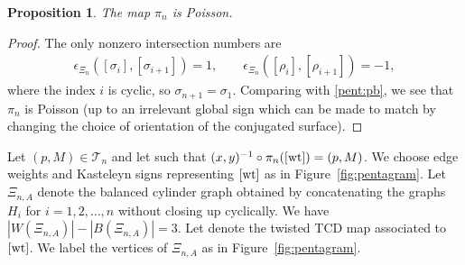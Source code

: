 \documentclass[10pt,a4paper]{amsart}
\numberwithin{equation}{section}
\newtheorem{Proposition}[Theorem]{Proposition}
 { \theoremstyle{definition}
\newtheorem{Definition}[Theorem]{Definition}
\newtheorem{Note}[Theorem]{Note}
\newtheorem{Example}[Theorem]{Example}
\newtheorem{Remark}[Theorem]{Remark} }
\newcommand{\CP}{{\mathbb C\mathrm P}}
\newcommand{\A}{{\mathbb A}}
\newcommand{\ra}{\rightarrow}
\newcommand{\wt}{{\rm wt}}
\def\A{A}
\def\widehat#1{#1}
\begin{document}

	\begin{Proposition}
		The map $\pi_n$ is Poisson.
	\end{Proposition}
	\begin{proof}
		The only nonzero intersection numbers are
		\begin{align*}
			\epsilon_{\Xi_n}([\sigma_i],[\sigma_{i + 1}])= 1, \qquad \epsilon_{\Xi_n}([\rho_i],[\rho_{i + 1}])= -1,
		\end{align*}
		where the index $i$ is cyclic, so $\sigma_{n+1}=\sigma_1$.
		Comparing with \eqref{pent:pb}, we see that $\pi_n$ is Poisson (up to an irrelevant global sign which can be made to match by changing the choice of orientation of the conjugated surface).
	\end{proof}

	Let $(p,M) \in \mathcal T_n$ and let \smash{$[\wt] \in \mathcal X_{N(\Xi_n)}^\lambda$} such that $(x,y)^{-1} \circ \pi_n([\wt])=(p,M)$. We choose edge weights and Kasteleyn signs representing $[\wt]$ as in Figure~\ref{fig:pentagram}. Let $\Xi_{n,\A}$ denote the balanced cylinder graph obtained by concatenating the graphs $H_i$ for $i=1,2,\dots,n$ without closing up cyclically.	We have $|W(\Xi_{n,\A})|-|B(\Xi_{n,\A})|=3$. Let \smash{$P\colon W\big(\Xi_{n,\widehat \A}\big) \ra \CP^2$} denote the twisted TCD map associated to $[\wt]$. We label the vertices of $\Xi_{n,\A}$ as in Figure~\ref{fig:pentagram}.
	
\end{document}
